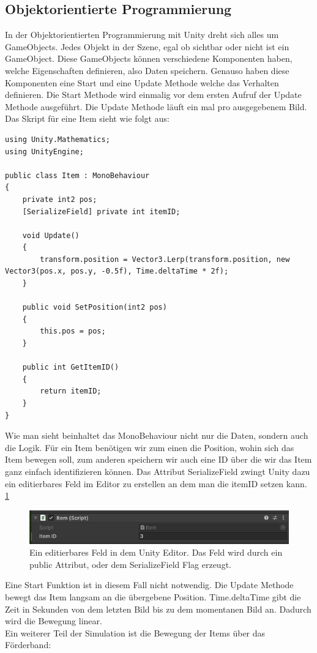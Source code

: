 \documentclass[12pt, titlepage]{article}
\begin{document}
\subsection{Objektorientierte Programmierung}
In der Objektorientierten Programmierung mit Unity dreht sich alles um GameObjects. Jedes Objekt in der Szene, egal ob sichtbar oder nicht ist ein GameObject. Diese GameObjects können verschiedene Komponenten haben, welche Eigenschaften definieren, also Daten speichern. Genauso haben diese Komponenten eine Start und eine Update Methode welche das Verhalten definieren. Die Start Methode wird einmalig vor dem ersten Aufruf der Update Methode ausgeführt. Die Update Methode läuft ein mal pro ausgegebenem Bild. Das Skript für eine Item sieht wie folgt aus:
\begin{lstlisting}[style=code, caption={Item Komponente OOP}]
using Unity.Mathematics;
using UnityEngine;

public class Item : MonoBehaviour
{
    private int2 pos;
    [SerializeField] private int itemID;

    void Update()
    {
        transform.position = Vector3.Lerp(transform.position, new Vector3(pos.x, pos.y, -0.5f), Time.deltaTime * 2f);
    }

    public void SetPosition(int2 pos)
    {
        this.pos = pos;
    }

    public int GetItemID()
    {
        return itemID;
    }
}
\end{lstlisting}
Wie man sieht beinhaltet das MonoBehaviour nicht nur die Daten, sondern auch die Logik. Für ein Item benötigen wir zum einen die Position, wohin sich das Item bewegen soll, zum anderen speichern wir auch eine ID über die wir das Item ganz einfach identifizieren können. Das Attribut \glqq SerializeField\grqq{} zwingt Unity dazu ein editierbares Feld im Editor zu erstellen an dem man die itemID setzen kann. \ref{fig:SerializeField}
\begin{figure}
\includegraphics[scale=1]{Bilder/SerializeField.png}
\caption{Ein editierbares Feld in dem Unity Editor. Das Feld wird durch ein public Attribut, oder dem SerializeField Flag erzeugt.}
\label{fig:SerializeField}
\end{figure}
Eine Start Funktion ist in diesem Fall nicht notwendig. Die Update Methode bewegt das Item langsam an die übergebene Position. Time.deltaTime gibt die Zeit in Sekunden von dem letzten Bild bis zu dem momentanen Bild an. Dadurch wird die Bewegung linear.\\Ein weiterer Teil der Simulation ist die Bewegung der Items über das Förderband: 
\end{document}
